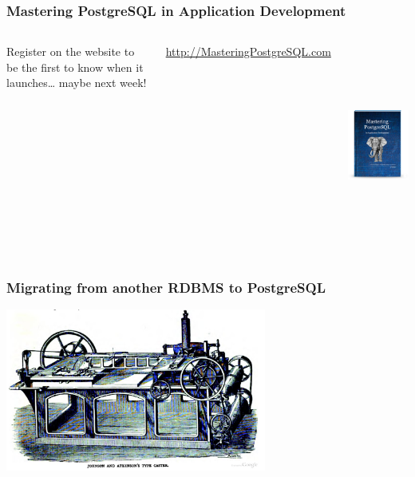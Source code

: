 \documentclass[xcolor=dvipsnames]{beamer}
\begin{document}
\begin{frame}
  \frametitle{Mastering PostgreSQL in Application Development}

  \begin{columns}[c]
    \begin{minipage}[t][12em][t]{\textwidth}
      
      \vfill
      
      Register on the website to be the first to know when it launches…
      maybe next week!

      \vfill
      \url{http://MasteringPostgreSQL.com}
    \end{minipage}

    \begin{center}
      \href{http://MasteringPostgreSQL.com}
           {\includegraphics[height=18em]{MasteringPostgreSQLinAppDev-Cover.png}}
    \end{center}
  \end{columns}
\end{frame}

\begin{frame}
  \frametitle{Migrating from another RDBMS to PostgreSQL}

  \begin{center}
    \includegraphics[height=2.1in]{TypeCaster.jpg}
  \end{center}
\end{frame}
\end{document}
